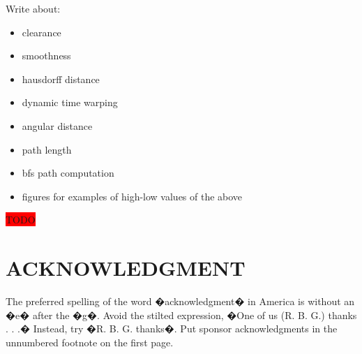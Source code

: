 \documentclass[letterpaper, 10 pt, conference]{ieeeconf}  %
\newcommand{\todo}{\colorbox{red}{TODO}}
\begin{document}
Write about:
\begin{itemize}
\item clearance
\item smoothness
\item hausdorff distance
\item dynamic time warping
\item angular distance
\item path length
\item bfs path computation
\item figures for examples of high-low values of the above
\end{itemize}
\todo

\addtolength{\textheight}{-12cm}   %







\section*{ACKNOWLEDGMENT}

The preferred spelling of the word �acknowledgment� in America is without an �e� after the �g�. Avoid the stilted expression, �One of us (R. B. G.) thanks . . .�  Instead, try �R. B. G. thanks�. Put sponsor acknowledgments in the unnumbered footnote on the first page.





\end{document}
